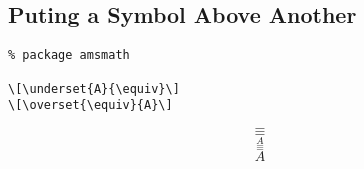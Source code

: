 \subsection{Puting a Symbol Above Another}
\label{sec:puting-symbol-above}

\begin{lstlisting}
% package amsmath

\[\underset{A}{\equiv}\]
\[\overset{\equiv}{A}\]
\end{lstlisting}

\[\underset{A}{\equiv}\]
\[\overset{\equiv}{A}\]


